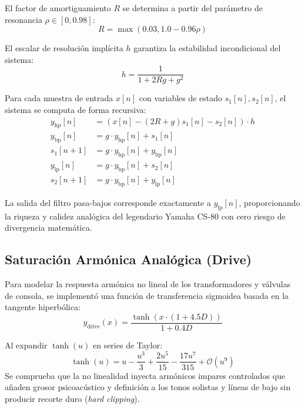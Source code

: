 \documentclass[11pt,a4paper]{article}
\begin{document}
El factor de amortiguamiento $R$ se determina a partir del parámetro de resonancia $\rho \in [0, 0.98]$:
\begin{equation}
R = \max\left(0.03, 1.0 - 0.96 \rho\right)
\end{equation}

El escalar de resolución implícita $h$ garantiza la estabilidad incondicional del sistema:
\begin{equation}
h = \frac{1}{1 + 2 R g + g^2}
\end{equation}

Para cada muestra de entrada $x[n]$ con variables de estado $s_1[n], s_2[n]$, el sistema se computa de forma recursiva:
\begin{align}
y_{\text{hp}}[n] &= \left(x[n] - (2R + g)s_1[n] - s_2[n]\right) \cdot h \\
y_{\text{bp}}[n] &= g \cdot y_{\text{hp}}[n] + s_1[n] \\
s_1[n+1] &= g \cdot y_{\text{hp}}[n] + y_{\text{bp}}[n] \\
y_{\text{lp}}[n] &= g \cdot y_{\text{bp}}[n] + s_2[n] \\
s_2[n+1] &= g \cdot y_{\text{bp}}[n] + y_{\text{lp}}[n]
\end{align}

La salida del filtro pasa-bajos corresponde exactamente a $y_{\text{lp}}[n]$, proporcionando la riqueza y calidez analógica del legendario Yamaha CS-80 con cero riesgo de divergencia matemática.

\subsection{Saturación Armónica Analógica (Drive)}
Para modelar la respuesta armónica no lineal de los transformadores y válvulas de consola, se implementó una función de transferencia sigmoidea basada en la tangente hiperbólica:
\begin{equation}
y_{\text{drive}}(x) = \frac{\tanh\left(x \cdot (1 + 4.5 D)\right)}{1 + 0.4 D}
\end{equation}

Al expandir $\tanh(u)$ en series de Taylor:
\begin{equation}
\tanh(u) = u - \frac{u^3}{3} + \frac{2u^5}{15} - \frac{17u^7}{315} + \mathcal{O}(u^9)
\end{equation}
Se comprueba que la no linealidad inyecta armónicos impares controlados que añaden grosor psicoacústico y definición a los tonos solistas y líneas de bajo sin producir recorte duro (\textit{hard clipping}).
\end{document}

